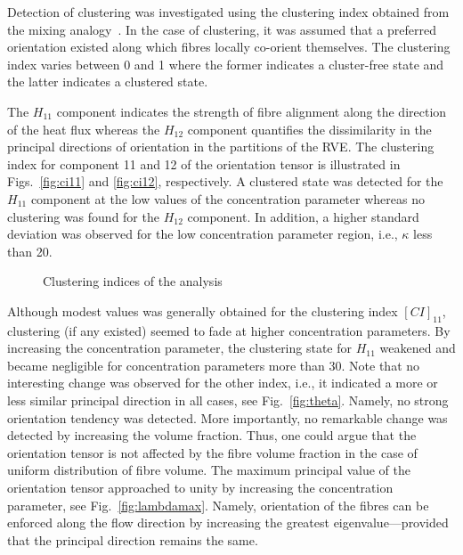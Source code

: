 Detection of clustering was investigated using the clustering index obtained from the mixing analogy~\autocite{Ranganathan.1990}. In the case of clustering, it was assumed that a preferred orientation existed along which fibres locally co-orient themselves. The clustering index varies between 0 and 1 where the former indicates a cluster-free state and the latter indicates a clustered state.

The $H_{11}$ component indicates the strength of fibre alignment along the direction of the heat flux whereas the $H_{12}$ component quantifies the dissimilarity in the principal directions of orientation in the partitions of the RVE. The clustering index for component 11 and 12 of the orientation tensor is illustrated in Figs.~\ref{fig:ci11} and \ref{fig:ci12}, respectively. A clustered state was detected for the $H_{11}$ component at the low values of the concentration parameter whereas no clustering was found for the $H_{12}$ component. In addition, a higher standard deviation was observed for the low concentration parameter region, i.e., $\kappa$ less than 20. 

	\begin{figure}[!h]
	\centering
	\hfill
	\caption{Clustering indices of the analysis}\label{figure:hc2_clus}
	\end{figure}%

	Although modest values was generally obtained for the clustering index $[CI]_{11}$, clustering (if any existed) seemed to fade at higher concentration parameters. By increasing the concentration parameter, the clustering state for $H_{11}$ weakened and became negligible for concentration parameters more than 30. Note that no interesting change was observed for the other index, i.e., it indicated a more or less similar principal direction in all cases, see Fig.~\ref{fig:theta}. Namely, no strong orientation tendency was detected. More importantly, no remarkable change was detected by increasing the volume fraction. Thus, one could argue that the orientation tensor is not affected by the fibre volume fraction in the case of uniform distribution of fibre volume. The maximum principal value of the orientation tensor approached to unity by increasing the concentration parameter, see Fig.~\ref{fig:lambdamax}. Namely, orientation of the fibres can be enforced along the flow direction by increasing the greatest eigenvalue---provided that the principal direction remains the same.

